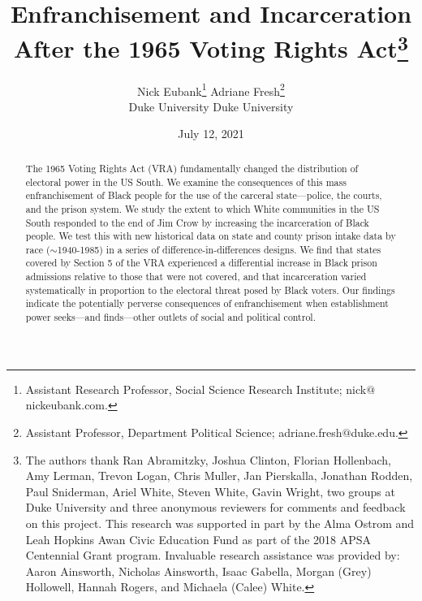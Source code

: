 \documentclass[12pt]{article}
\begin{document}
\onehalfspacing
\setlength{\parindent}{0.0in}
\setlength{\parskip}{.125in}


\title{Enfranchisement and Incarceration \\ After the 1965 Voting Rights Act\footnote{\footnotesize The authors thank Ran Abramitzky, Joshua Clinton, Florian Hollenbach, Amy Lerman, Trevon Logan, Chris Muller, Jan Pierskalla, Jonathan Rodden, Paul Sniderman, Ariel White, Steven White, Gavin Wright, two groups at Duke University and three anonymous reviewers for comments and feedback on this project.  This research was supported in part by the Alma Ostrom and Leah Hopkins Awan Civic Education Fund as part of the 2018 APSA Centennial Grant program.  Invaluable research assistance was provided by: Aaron Ainsworth, Nicholas Ainsworth, Isaac Gabella, Morgan (Grey) Hollowell, Hannah Rogers, and Michaela (Calee) White. }}

\author{\vspace*{.2in} \hspace*{.1in} Nick Eubank\footnote{\footnotesize Assistant Research Professor, Social Science Research Institute; nick$@$nickeubank.com. } \hspace*{.6in}   Adriane Fresh\footnote{\footnotesize Assistant Professor, Department Political Science; adriane.fresh$@$duke.edu. } \\ \vspace*{-.12in} \hspace*{.1in} Duke University  \hspace*{.45in}  Duke University  }

\date{July 12, 2021 }


\maketitle





\begin{abstract}
\bigskip \onehalfspacing
\noindent The 1965 Voting Rights Act (VRA) fundamentally changed the distribution of electoral power in the US South.  We examine the consequences of this mass enfranchisement of Black people for the use of the carceral state---police, the courts, and the prison system.  We study the extent to which White communities in the US South responded to the end of Jim Crow by increasing the incarceration of Black people. We test this with new historical data on state and county prison intake data by race ($\sim$1940-1985) in a series of difference-in-differences designs. We find that states covered by Section 5 of the VRA experienced a differential increase in Black prison admissions relative to those that were not covered, and that incarceration varied systematically in proportion to the electoral threat posed by Black voters.  Our findings indicate the potentially perverse consequences of enfranchisement when establishment power seeks---and finds---other outlets of social and political control.
\end{abstract}
\end{document}
